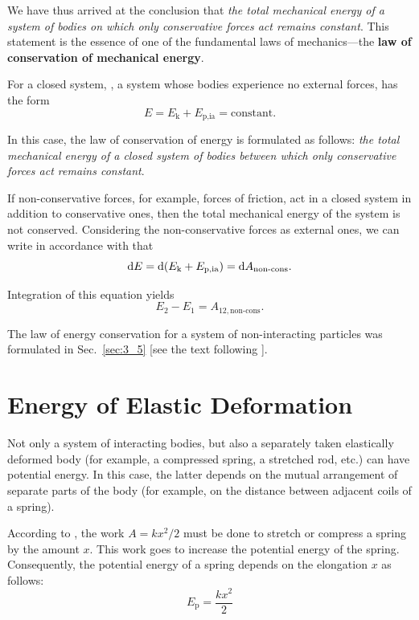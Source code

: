 \noindent
We have thus arrived at the conclusion that \textit{the total mechanical energy of a system of bodies on which only conservative forces act remains constant}. This statement is the essence of one of the fundamental laws of mechanics---the \textbf{law of conservation of mechanical energy}.

For a closed system, \ie, a system whose bodies experience no external forces,  has the form
\begin{equation}\label{eq:3_75}
E = E_{\text{k}} + E_{\text{p,ia}} = \text{constant}.
\end{equation}

\noindent
In this case, the law of conservation of energy is formulated as follows: \textit{the total mechanical energy of a closed system of bodies between which only conservative forces act remains constant}.

If non-conservative forces, for example, forces of friction, act in a closed system in addition to conservative ones, then the total mechanical energy of the system is not conserved. Considering the non-conservative forces as external ones, we can write in accordance with  that
\begin{equation}\label{eq:3_76}
\mathrm{d} E = \mathrm{d}(E_{\text{k}} + E_{\text{p,ia}}) = \mathrm{d} A_{\text{non-cons}}.
\end{equation}

\noindent
Integration of this equation yields
\begin{equation}\label{eq:3_77}
E_2 - E_1 = A_{12,\text{non-cons}}.
\end{equation}

The law of energy conservation for a system of non-interacting particles was formulated in Sec.~\ref{sec:3_5} [see the text following ].

\section{Energy of Elastic Deformation}\label{sec:3_8}

Not only a system of interacting bodies, but also a separately taken elastically deformed body (for example, a compressed spring, a stretched rod, etc.) can have potential energy. In this case, the latter depends on the mutual arrangement of separate parts of the body (for example, on the distance between adjacent coils of a spring).

According to , the work $A=kx^2/2$ must be done to stretch or compress a spring by the amount $x$. This work goes to increase the potential energy of the spring. Consequently, the potential energy of a spring depends on the elongation $x$ as follows:
\begin{equation}\label{eq:3_78}
E_{\text{p}} = \frac{kx^2}{2}
\end{equation}

